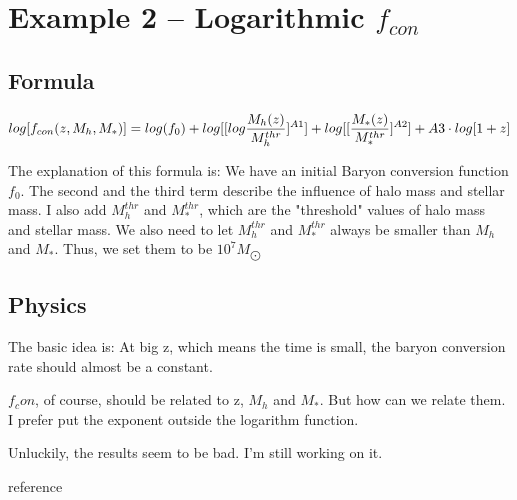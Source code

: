\documentclass[ajp]{article}   	%
\begin{document}
\section{Example 2 -- Logarithmic $f_{con}$}

\subsection{Formula}


\begin{equation}
log[f_{con}(z,M_h, M_*)] = log(f_0) +  log[[log{{M_h(z)} \over{M_h^{thr}}}]^{A1}]+  log[[{{M_*(z)} \over{M_*^{thr}}}]^{A2}] + A3 \cdot log[1+z]
\end{equation}
\bigskip

The explanation of this formula is: We have an initial Baryon conversion function $f_0$. The second and the third term describe the influence of halo mass and stellar mass. I also add $M_h^{thr}$ and $M_*^{thr}$, which are the "threshold" values of halo mass and stellar mass. We also need to let $M_h^{thr}$ and $M_*^{thr}$ always be smaller than $M_h$ and $M_*$. Thus, we set them to be $10^{7}M_{\bigodot}$



\subsection{Physics}
The basic idea is: At big z, which means the time is small, the baryon conversion rate should almost be a constant. 

$f_con$, of course, should be related to z, $M_h$ and $M_*$. But how can we relate them. I prefer put the exponent outside the logarithm function.





Unluckily, the results seem to be bad. I'm still working on it.



reference
 
\end{document}
